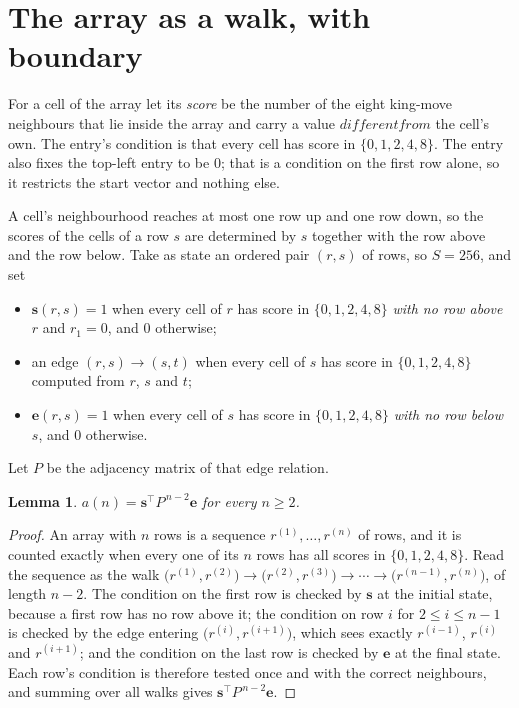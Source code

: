 \documentclass[11pt,a4paper]{article}
\theoremstyle{plain}
\newtheorem{lemma}[theorem]{Lemma}
\theoremstyle{definition}
\begin{document}
\section{The array as a walk, with boundary}

For a cell of the array let its \emph{score} be the number of the eight king-move neighbours that lie inside
the array and carry a value $different from$ the cell's own. The entry's condition is that every cell
has score in $\{0,1,2,4,8\}$. The entry also fixes the top-left entry to be $0$; that is a condition on the first row alone, so it restricts the start vector and nothing else.

A cell's neighbourhood reaches at most one row up and one row down, so the scores of the
cells of a row $s$ are determined by $s$ together with the row above and the row below.
Take as state an ordered pair $(r,s)$ of rows, so $S=256$, and set
\begin{itemize}
\item $\mathbf{s}(r,s)=1$ when every cell of $r$ has score in $\{0,1,2,4,8\}$ \emph{with no row
above $r$} and $r_1=0$, and $0$ otherwise;
\item an edge $(r,s)\to(s,t)$ when every cell of $s$ has score in $\{0,1,2,4,8\}$ computed from
$r$, $s$ and $t$;
\item $\mathbf{e}(r,s)=1$ when every cell of $s$ has score in $\{0,1,2,4,8\}$ \emph{with no row
below $s$}, and $0$ otherwise.
\end{itemize}
Let $P$ be the adjacency matrix of that edge relation.

\begin{lemma}\label{lem:walk}
$a(n)=\mathbf{s}^{\!\top}P^{\,n-2}\mathbf{e}$ for every $n\ge2$.
\end{lemma}

\begin{proof}
An array with $n$ rows is a sequence $r^{(1)},\dots,r^{(n)}$ of rows, and it is counted
exactly when every one of its $n$ rows has all scores in $\{0,1,2,4,8\}$. Read the sequence as the
walk $\bigl(r^{(1)},r^{(2)}\bigr)\to\bigl(r^{(2)},r^{(3)}\bigr)\to\cdots\to
\bigl(r^{(n-1)},r^{(n)}\bigr)$, of length $n-2$. The condition on the first row is
checked by $\mathbf{s}$ at the initial state, because a first row has no row above it; the
condition on row $i$ for $2\le i\le n-1$ is checked by the edge entering
$\bigl(r^{(i)},r^{(i+1)}\bigr)$, which sees exactly $r^{(i-1)}$, $r^{(i)}$ and
$r^{(i+1)}$; and the condition on the last row is checked by $\mathbf{e}$ at the final
state. Each row's condition is therefore tested once and with the correct neighbours, and
summing over all walks gives $\mathbf{s}^{\!\top}P^{\,n-2}\mathbf{e}$.
\end{proof}
\end{document}
